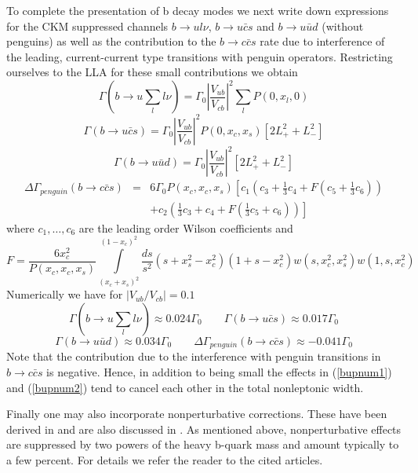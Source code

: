 To complete the presentation of b decay modes we next write down
expressions for the CKM suppressed channels $b \to u l \nu$, $b\to
u\bar cs$ and $b\to u\bar ud$ (without penguins) as well as the
contribution to the $b\to c\bar cs$ rate due to interference of the
leading, current-current type transitions with penguin operators.
Restricting ourselves to the LLA for these small contributions we
obtain
\begin{equation}\label{buln}
\Gamma(b\to u\sum_l l\nu)=\Gamma_0 |\frac{V_{ub}}{V_{cb}}|^2
\sum_l P(0,x_l,0)
\end{equation} 
\begin{equation}\label{bucs}
\Gamma(b\to u\bar cs)=\Gamma_0 |\frac{V_{ub}}{V_{cb}}|^2
 P(0,x_c,x_s) \left[2L^2_++L^2_-\right]
\end{equation} 
\begin{equation}\label{buud}
\Gamma(b\to u\bar ud)=\Gamma_0 |\frac{V_{ub}}{V_{cb}}|^2
  \left[2L^2_++L^2_-\right]
\end{equation} 
\begin{eqnarray}\label{pbccs}
\Delta\Gamma_{penguin}(b\to c\bar cs) &=& 6\Gamma_0P(x_c,x_c,x_s)
\left[c_1\left(c_3+\frac{1}{3}c_4+F(c_5+\frac{1}{3}c_6)\right)\right.
\nonumber \\
&&+\left.c_2\left(\frac{1}{3}c_3+c_4+F(\frac{1}{3}c_5+c_6)\right)\right]
\end{eqnarray}
where $c_1, \ldots, c_6$ are the leading order Wilson coefficients and
\begin{equation}\label{fpeng}
F=\frac{6x^2_c}{P(x_c,x_c,x_s)}\int\limits_{(x_c+x_s)^2}^{(1-x_c)^2}
\frac{ds}{s^2}(s+x^2_s-x^2_c)(1+s-x^2_c) w(s,x^2_c,x^2_s) w(1,s,x^2_c)
\end{equation}
Numerically we have for $|V_{ub}/V_{cb}|=0.1$
\begin{equation}\label{bupnum1}
\Gamma(b\to u\sum_l l\nu)\approx 0.024 \Gamma_0 \qquad
\Gamma(b\to u\bar cs)\approx 0.017 \Gamma_0
\end{equation}
\begin{equation}\label{bupnum2}
\Gamma(b\to u\bar ud)\approx 0.034 \Gamma_0 \qquad
\Delta\Gamma_{penguin}(b\to c\bar cs)\approx -0.041 \Gamma_0
\end{equation}
Note that the contribution due to the interference with penguin
transitions in $b\to c\bar cs$ is negative. Hence, in addition to 
being small the effects in (\ref{bupnum1}) and (\ref{bupnum2}) tend
to cancel each other in the total nonleptonic width.

Finally one may also incorporate nonperturbative corrections. These
have been derived in \cite{bigietal:92} and are also discussed in
\cite{baganetal:94a}. As mentioned above, nonperturbative effects are
suppressed by two powers of the heavy b-quark mass and amount typically
to a few percent. For details we refer the reader to the cited
articles.


